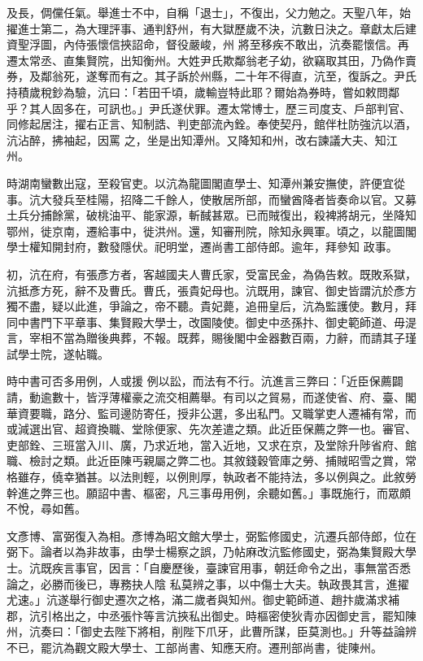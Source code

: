 \begin{pinyinscope}
 及長，倜儻任氣。舉進士不中，自稱「退士」，不復出，父力勉之。天聖八年，始擢進士第二，為大理評事、通判舒州，有大獄歷歲不決，沆數日決之。章獻太后建資聖浮圖，內侍張懷信挾詔命，督役嚴峻，州
 將至移疾不敢出，沆奏罷懷信。再遷太常丞、直集賢院，出知衡州。大姓尹氏欺鄰翁老子幼，欲竊取其田，乃偽作賣券，及鄰翁死，遂奪而有之。其子訴於州縣，二十年不得直，沆至，復訴之。尹氏持積歲稅鈔為驗，沆曰：「若田千頃，歲輸豈特此耶？爾始為券時，嘗如敕問鄰乎？其人固多在，可訊也。」尹氏遂伏罪。遷太常博士，歷三司度支、戶部判官、同修起居注，擢右正言、知制誥、判吏部流內銓。奉使契丹，館伴杜防強沆以酒，沆沾醉，拂袖起，因罵
 之，坐是出知潭州。又降知和州，改右諫議大夫、知江州。



 時湖南蠻數出寇，至殺官吏。以沆為龍圖閣直學士、知潭州兼安撫使，許便宜從事。沆大發兵至桂陽，招降二千餘人，使散居所部，而蠻酋降者皆奏命以官。又募土兵分捕餘黨，破桃油平、能家源，斬馘甚眾。已而賊復出，殺裨將胡元，坐降知鄂州，徙京南，遷給事中，徙洪州。還，知審刑院，除知永興軍。頃之，以龍圖閣學士權知開封府，數發隱伏。祀明堂，遷尚書工部侍郎。逾年，拜參知
 政事。



 初，沆在府，有張彥方者，客越國夫人曹氏家，受富民金，為偽告敕。既敗系獄，沆抵彥方死，辭不及曹氏。曹氏，張貴妃母也。沆既用，諫官、御史皆謂沆於彥方獨不盡，疑以此進，爭論之，帝不聽。貴妃薨，追冊皇后，沆為監護使。數月，拜同中書門下平章事、集賢殿大學士，改園陵使。御史中丞孫抃、御史範師道、毋湜言，宰相不當為贈後典葬，不報。既葬，賜後閣中金器數百兩，力辭，而請其子瑾試學士院，遂帖職。



 時中書可否多用例，人或援
 例以訟，而法有不行。沆進言三弊曰：「近臣保薦闢請，動逾數十，皆浮薄權豪之流交相薦舉。有司以之貿易，而遂使省、府、臺、閣華資要職，路分、監司邊防寄任，授非公選，多出私門。又職掌吏人遷補有常，而或減選出官、超資換職、堂除便家、先次差遣之類。此近臣保薦之弊一也。審官、吏部銓、三班當入川、廣，乃求近地，當入近地，又求在京，及堂除升陟省府、館職、檢討之類。此近臣陳丐親屬之弊二也。其敘錢穀管庫之勞、捕賊昭雪之賞，常
 格雖存，僥幸猶甚。以法則輕，以例則厚，執政者不能持法，多以例與之。此敘勞幹進之弊三也。願詔中書、樞密，凡三事毋用例，余聽如舊。」事既施行，而眾頗不悅，尋如舊。



 文彥博、富弼復入為相。彥博為昭文館大學士，弼監修國史，沆遷兵部侍郎，位在弼下。論者以為非故事，由學士楊察之誤，乃帖麻改沆監修國史，弼為集賢殿大學士。沆既疾言事官，因言：「自慶歷後，臺諫官用事，朝廷命令之出，事無當否悉論之，必勝而後已，專務抉人陰
 私莫辨之事，以中傷士大夫。執政畏其言，進擢尤速。」沆遂舉行御史遷次之格，滿二歲者與知州。御史範師道、趙抃歲滿求補郡，沆引格出之，中丞張忭等言沆挾私出御史。時樞密使狄青亦因御史言，罷知陳州，沆奏曰：「御史去陛下將相，削陛下爪牙，此曹所謀，臣莫測也。」升等益論辨不已，罷沆為觀文殿大學士、工部尚書、知應天府。遷刑部尚書，徙陳州。




\end{pinyinscope}
